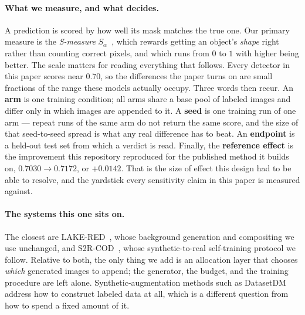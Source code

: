 \documentclass{article}
\begin{document}
\paragraph{What we measure, and what decides.} A prediction is scored by how well its mask matches
the true one. Our primary measure is the \emph{S-measure} $S_\alpha$~\citep{fan2017structure}, which
rewards getting an object's \emph{shape} right rather than counting correct pixels, and which runs
from $0$ to $1$ with higher being better. The scale matters for reading everything that follows. Every
detector in this paper scores near $0.70$, so the differences the paper turns on are small fractions
of the range these models actually occupy. Three words then recur. An \textbf{arm} is one training
condition; all arms share a base pool of labeled images and differ only in which images are
appended to it. A \textbf{seed} is one training run of one arm --- repeat runs of the same arm do
not return the same score, and the size of that seed-to-seed spread is what any real difference has
to beat. An \textbf{endpoint} is a held-out test set from which a verdict is read. Finally, the
\textbf{reference effect} is the improvement this repository reproduced for the published method it
builds on, $0.7030 \rightarrow 0.7172$, or $+0.0142$. That is the size of effect this design had to
be able to resolve, and the yardstick every sensitivity claim in this paper is measured against.

\paragraph{The systems this one sits on.} The closest are
LAKE-RED~\citep{zhao2024lakered}, whose background generation and compositing we use unchanged, and
S2R-COD~\citep{luo2025s2rcod}, whose synthetic-to-real self-training protocol we follow. Relative to
both, the only thing we add is an allocation layer that chooses \emph{which} generated images to
append; the generator, the budget, and the training procedure are left alone. Synthetic-augmentation methods such as DatasetDM~\citep{wu2023datasetdm} address how to construct labeled data at all,
which is a different question from how to spend a fixed amount of it.
\end{document}
